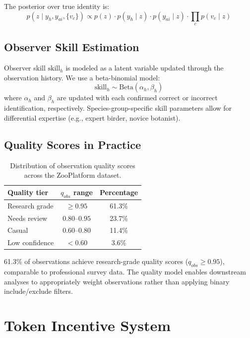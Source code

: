 \documentclass[11pt,a4paper]{article}
\begin{document}
The posterior over true identity is:
\begin{equation}
  p(z \mid y_h, y_{ai}, \{v_c\}) \propto
  p(z) \cdot p(y_h \mid z) \cdot p(y_{ai} \mid z) \cdot
  \prod_c p(v_c \mid z)
\end{equation}

\subsection{Observer Skill Estimation}

Observer skill $\text{skill}_h$ is modeled as a latent variable updated
through the observation history. We use a beta-binomial model:
\begin{equation}
  \text{skill}_h \sim \text{Beta}(\alpha_h, \beta_h)
\end{equation}
where $\alpha_h$ and $\beta_h$ are updated with each confirmed
correct or incorrect identification, respectively. Species-group-specific
skill parameters allow for differential expertise (e.g., expert birder,
novice botanist).

\subsection{Quality Scores in Practice}

\begin{table}[H]
\centering
\caption{Distribution of observation quality scores across the
ZooPlatform dataset.}
\label{tab:quality}
\begin{tabular}{lcc}
\toprule
\textbf{Quality tier} & \textbf{$q_{obs}$ range} & \textbf{Percentage} \\
\midrule
Research grade & $\geq 0.95$ & 61.3\% \\
Needs review & $0.80$--$0.95$ & 23.7\% \\
Casual & $0.60$--$0.80$ & 11.4\% \\
Low confidence & $< 0.60$ & 3.6\% \\
\bottomrule
\end{tabular}
\end{table}

61.3\% of observations achieve research-grade quality scores ($q_{obs}
\geq 0.95$), comparable to professional survey data. The quality model
enables downstream analyses to appropriately weight observations rather
than applying binary include/exclude filters.


\section{Token Incentive System}
\label{sec:incentives}
\end{document}

